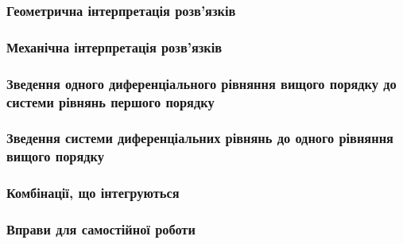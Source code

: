 \documentclass[a4paper, 12pt]{article}
\theoremstyle{definition}
\numberwithin{equation}{section}%
\numberwithin{equation}{subsection}
\begin{document}


\subsubsection{Геометрична інтерпретація розв’язків}



\subsubsection{Механічна інтерпретація розв’язків}



\subsubsection{Зведення одного диференціального рівняння вищого порядку до системи рівнянь першого порядку}



\subsubsection{Зведення системи диференціальних рівнянь до одного рівняння вищого порядку}



\subsubsection{Комбінації, що інтегруються}



\subsubsection{Вправи для самостійної роботи}



\newpage

\nocite{*}




\end{document}
